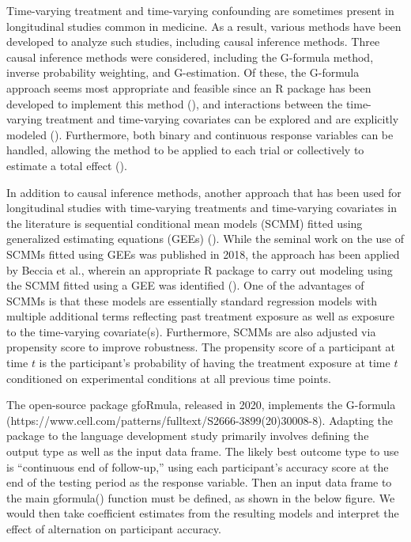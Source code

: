 \documentclass[
  letterpaper,
]{report}
\begin{document}
Time-varying treatment and time-varying confounding are sometimes
present in longitudinal studies common in medicine. As a result, various
methods have been developed to analyze such studies, including causal
inference methods. Three causal inference methods were considered,
including the G-formula method, inverse probability weighting, and
G-estimation. Of these, the G-formula approach seems most appropriate
and feasible since an R package has been developed to implement this
method (\textcite{mcgrath_gformula_2020}), and interactions between the
time-varying treatment and time-varying covariates can be explored and
are explicitly modeled (\textcite{daniel_methods_2013}). Furthermore,
both binary and continuous response variables can be handled, allowing
the method to be applied to each trial or collectively to estimate a
total effect (\textcite{daniel_methods_2013}).

In addition to causal inference methods, another approach that has been
used for longitudinal studies with time-varying treatments and
time-varying covariates in the literature is sequential conditional mean
models (SCMM) fitted using generalized estimating equations (GEEs)
(\textcite{keogh_analysis_2018}). While the seminal work on the use of
SCMMs fitted using GEEs was published in 2018, the approach has been
applied by Beccia et al., wherein an appropriate R package to carry out
modeling using the SCMM fitted using a GEE was identified
(\textcite{beccia_cumulative_2022}). One of the advantages of SCMMs is
that these models are essentially standard regression models with
multiple additional terms reflecting past treatment exposure as well as
exposure to the time-varying covariate(s). Furthermore, SCMMs are also
adjusted via propensity score to improve robustness. The propensity
score of a participant at time \(t\) is the participant's probability of
having the treatment exposure at time \(t\) conditioned on experimental
conditions at all previous time points.

The open-source package gfoRmula, released in 2020, implements the
G-formula
(https://www.cell.com/patterns/fulltext/S2666-3899(20)30008-8). Adapting
the package to the language development study primarily involves
defining the output type as well as the input data frame. The likely
best outcome type to use is ``continuous end of follow-up,'' using each
participant's accuracy score at the end of the testing period as the
response variable. Then an input data frame to the main gformula()
function must be defined, as shown in the below figure. We would then
take coefficient estimates from the resulting models and interpret the
effect of alternation on participant accuracy.
\end{document}
